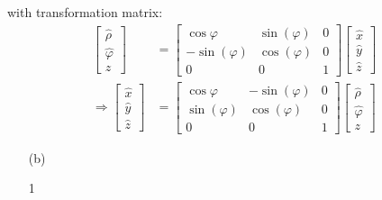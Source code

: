 \documentclass[11pt,a4paper]{article}
\begin{document}
\begin{enumerate}
with transformation matrix:
\begin{align*}
\begin{bmatrix}
\hat{\rho} \\
\hat{\varphi} \\
z
\end{bmatrix}
&=
\begin{bmatrix}
\cos\varphi & \sin(\varphi) & 0 \\
-\sin(\varphi) & \cos(\varphi) & 0 \\
0 & 0 & 1
\end{bmatrix}
\begin{bmatrix}
\hat{x} \\
\hat{y} \\
\hat{z}
\end{bmatrix}
\\
\Rightarrow
\begin{bmatrix}
\hat{x} \\
\hat{y} \\
\hat{z}
\end{bmatrix}
&=
\begin{bmatrix}
\cos\varphi & -\sin(\varphi) & 0 \\
\sin(\varphi) & \cos(\varphi) & 0 \\
0 & 0 & 1
\end{bmatrix}
\begin{bmatrix}
\hat{\rho} \\
\hat{\varphi} \\
z
\end{bmatrix}
\end{align*}

\end{enumerate}

\newpage

\begin{enumerate}
\item[(b)]

1

\end{enumerate}
\end{document}
